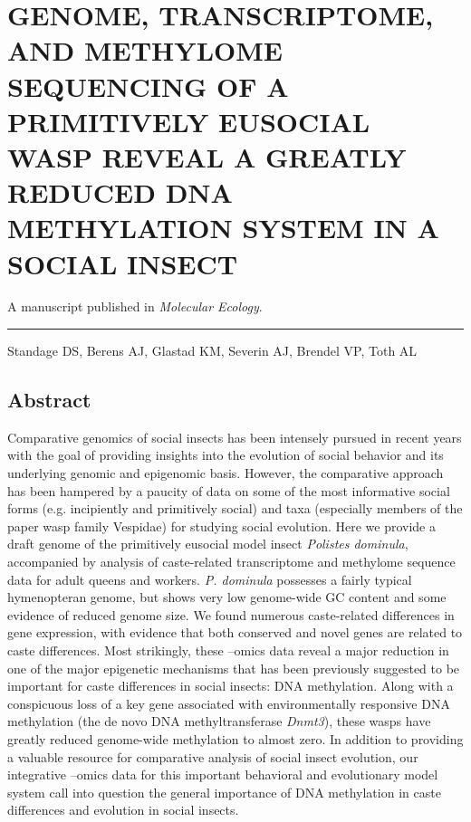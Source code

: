 \chapter{GENOME, TRANSCRIPTOME, AND METHYLOME SEQUENCING OF A PRIMITIVELY EUSOCIAL WASP REVEAL A GREATLY REDUCED DNA METHYLATION SYSTEM IN A SOCIAL INSECT}

A manuscript published in \textit{Molecular Ecology}.

\noindent\hfil\rule{0.5\textwidth}{.4pt}\hfil

Standage DS, Berens AJ, Glastad KM, Severin AJ, Brendel VP, Toth AL

\section{Abstract}

Comparative genomics of social insects has been intensely pursued in
recent years with the goal of providing insights into the evolution of
social behavior and its underlying genomic and epigenomic basis.
However, the comparative approach has been hampered by a paucity of data
on some of the most informative social forms (e.g. incipiently and
primitively social) and taxa (especially members of the paper wasp
family Vespidae) for studying social evolution. Here we provide a draft
genome of the primitively eusocial model insect \textit{Polistes
dominula}, accompanied by analysis of caste-related transcriptome and
methylome sequence data for adult queens and workers. \textit{P. dominula}
possesses a fairly typical hymenopteran genome, but shows very low
genome-wide GC content and some evidence of reduced genome size. We
found numerous caste-related differences in gene expression, with
evidence that both conserved and novel genes are related to caste
differences. Most strikingly, these --omics data reveal a major
reduction in one of the major epigenetic mechanisms that has been
previously suggested to be important for caste differences in social
insects: DNA methylation. Along with a conspicuous loss of a key gene
associated with environmentally responsive DNA methylation (the de novo
DNA methyltransferase \textit{Dnmt3}), these wasps have greatly reduced
genome-wide methylation to almost zero. In addition to providing a
valuable resource for comparative analysis of social insect evolution,
our integrative --omics data for this important behavioral and
evolutionary model system call into question the general importance of
DNA methylation in caste differences and evolution in social insects.


